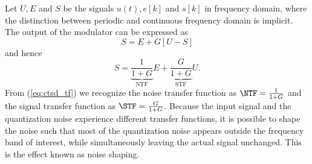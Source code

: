 Let $U, E$ and $S$ be the signals $u(t), e[k]$ and $s[k]$ in frequency domain, where the distinction between periodic and continuous frequency domain is implicit. The output of the modulator can be expressed as
\begin{equation}
    S = E + G[U - S]
\end{equation}
and hence
\begin{equation}
    \label{eq:ctsd_tf}
    S = \underbrace{\frac{1}{1+G}}_\text{NTF}E + \underbrace{\frac{G}{1 + G}}_\text{STF}U.
\end{equation}
From (\ref{eq:ctsd_tf}) we recognize the noise transfer function as $\NTF = \frac{1}{1+G}$ and the signal transfer function as $\STF = \frac{G}{1 + G}$. Because the input signal and the quantization noise experience different transfer functions, it is possible to shape the noise such that most of the quantization noise appears outside the frequency band of interest, while simultaneously leaving the actual signal unchanged. This is the effect known as noise shaping.
